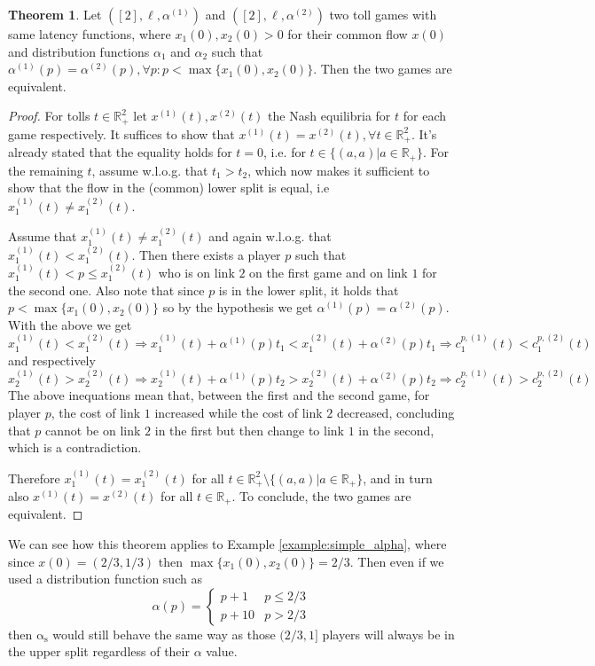\documentclass[10pt,a4paper]{book}
\newcommand{\as}{\mathrm{\alpha_s}}
\newcommand{\R}{\mathbb{R}}
\theoremstyle{definition}
\newtheorem{theorem}[definition]{Theorem}
\theoremstyle{comment}
\begin{document}
\begin{theorem}
	\label{theorem:alpha_upper_irrelevant}
	Let $([2], \ell, \alpha^{(1)})$ and $([2], \ell, \alpha^{(2)})$ two toll games with same latency functions, where $x_1(0), x_2(0) > 0$ for their common flow $x(0)$ and distribution functions $\alpha_1$ and $\alpha_2$ such that $\alpha^{(1)}(p) = \alpha^{(2)}(p), \forall p: p < \max\{x_1(0), x_2(0)\}$.
	Then the two games are equivalent.
\end{theorem}

\begin{proof}
	For tolls $t \in \R_+^2$ let $x^{(1)}(t), x^{(2)}(t)$ the Nash equilibria for $t$ for each game respectively.
	It suffices to show that $x^{(1)}(t) = x^{(2)}(t), \forall t \in \R_+^2$.
	It's already stated that the equality holds for $t = 0$, i.e. for $t \in \{(a, a) | a \in \R_+\}$.
	For the remaining $t$, assume w.l.o.g. that $t_1 > t_2$, which now makes it sufficient to show that the flow in the (common) lower split is equal, i.e $x_1^{(1)}(t) \ne x_1^{(2)}(t)$.

	Assume that $x_1^{(1)}(t) \ne x_1^{(2)}(t)$ and again w.l.o.g. that $x_1^{(1)}(t) < x_1^{(2)}(t)$.
	Then there exists a player $p$ such that $x_1^{(1)}(t) < p \le x_1^{(2)}(t)$ who is on link $2$ on the first game and on link $1$ for the second one.
	Also note that since $p$ is in the lower split, it holds that $p < \max\{x_1(0), x_2(0)\}$ so by the hypothesis we get $\alpha^{(1)}(p) = \alpha^{(2)}(p)$.
	With the above we get
	\[x_1^{(1)}(t) < x_1^{(2)}(t) \Rightarrow x_1^{(1)}(t) + \alpha^{(1)}(p)t_1 < x_1^{(2)}(t) + \alpha^{(2)}(p)t_1 \Rightarrow c_1^{p, (1)}(t) < c_1^{p, (2)}(t)\]
	and respectively
	\[x_2^{(1)}(t) > x_2^{(2)}(t) \Rightarrow x_2^{(1)}(t) + \alpha^{(1)}(p)t_2 > x_2^{(2)}(t) + \alpha^{(2)}(p)t_2 \Rightarrow c_2^{p, (1)}(t) > c_2^{p, (2)}(t)\]
	The above inequations mean that, between the first and the second game, for player $p$, the cost of link $1$ increased while the cost of link $2$ decreased, concluding that $p$ cannot be on link $2$ in the first but then change to link $1$ in the second, which is a contradiction.

	Therefore $x_1^{(1)}(t) = x_1^{(2)}(t)$ for all $t \in \R_+^2 \setminus \{(a, a) | a \in \R_+\}$, and in turn also $x^{(1)}(t) = x^{(2)}(t)$ for all $t \in \R_+$.
	To conclude, the two games are equivalent.
\end{proof}
We can see how this theorem applies to Example \ref{example:simple_alpha}, where since $x(0) = (2/3, 1/3)$ then $\max\{x_1(0), x_2(0)\} = 2/3$.
Then even if we used a distribution function such as
\[
	\alpha(p) =
	\begin{cases}
		p + 1 & p \le 2/3 \\
		p + 10 & p > 2/3
	\end{cases}
\]
then $\as$ would still behave the same way as those $(2/3, 1]$ players will always be in the upper split regardless of their $\alpha$ value.
\end{document}

